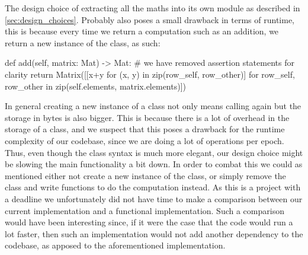 \documentclass[a4paper,oneside,article,english]{memoir}
\begin{document}
The design choice of extracting all the maths into its own module as described
in \cref{sec:design_choices}. Probably also poses a small drawback in terms of
runtime, this is because every time we return a computation such as an addition,
we return a new instance of the class, as such:
\begin{python}
def add(self, matrix: Mat) -> Mat: 
  # we have removed assertion statements for clarity
  return Matrix([[x+y for (x, y) in zip(row_self, row_other)] for row_self, row_other in zip(self.elements, matrix.elements)])
\end{python}
In general creating a new instance of a class not only means calling
 again but the storage in bytes is also bigger.
This is because there is a lot of overhead in the storage of a class, and we
suspect that this poses a drawback for the runtime complexity of our codebase,
since we are doing a lot of operations per epoch. Thus, even though the class
syntax is much more elegant, our design choice might be slowing the main
functionality a bit down. In order to combat this we could as mentioned either
not create a new instance of the class, or simply remove the class and write
functions to do the computation instead. As this is a project with a deadline we
unfortunately did not have time to make a comparison between our current
implementation and a functional implementation. Such a comparison would have
been interesting since, if it were the case that the code would run a lot
faster, then such an implementation would not add another dependency to the
codebase, as apposed to the aforementioned  implementation.





\end{document}
